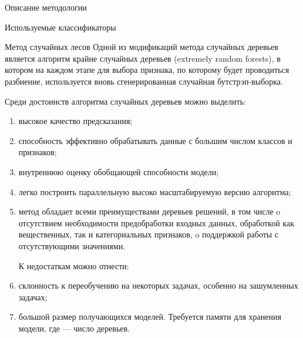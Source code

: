 \begin{section}{Описание методологии}
\begin{subsection}{Используемые классификаторы}
\begin{subsubsection}{Метод случайных лесов}
Одной из модификаций метода случайных деревьев является алгоритм крайне случайных деревьев (extremely random forests), в котором на каждом этапе для выбора признака, по которому будет проводиться разбиение, используется вновь сгенерированная случайная бутстрэп-выборка.

Среди достоинств алгоритма случайных деревьев можно выделить:
\begin{enumerate}
  \item высокое качество предсказания;
  \item способность эффективно обрабатывать данные с большим числом классов и признаков;
  \item внутреннюю оценку обобщающей способности модели;
  \item	легко построить параллельную высоко масштабируемую версию алгоритма;
  \item	метод обладает всеми преимуществами деревьев решений, в том числе
  o	отсутствием необходимости предобработки входных данных, обработкой как вещественных, так и категориальных признаков,
  o	поддержкой работы с отсутствующими значениями.

  К недостаткам можно отнести:
  \item	склонность к переобучению на некоторых задачах, особенно на зашумленных задачах;
  \item	большой размер получающихся моделей. Требуется  памяти для хранения модели, где  — число деревьев.
\end{enumerate}

    \end{subsubsection}

  \end{subsection}

\end{section}
